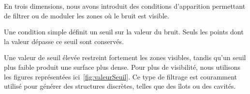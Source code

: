 En trois dimensions, nous avons introduit des conditions d’apparition permettant de filtrer ou de moduler les zones où le bruit est visible.

Une condition simple définit un seuil sur la valeur du bruit. 
Seuls les points dont la valeur dépasse ce seuil sont conservés.

Une valeur de seuil élevée restreint fortement les zones visibles, tandis qu’un seuil plus faible produit une surface plus dense. 
Pour plus de visibilité, nous utilisons les figures représentées ici~\ref{fig:valeurSeuil}.
Ce type de filtrage est couramment utilisé pour générer des structures discrètes, telles que des îlots ou des cavités.
